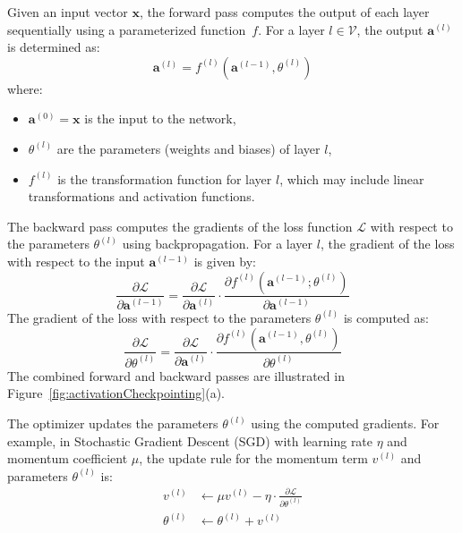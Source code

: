 \documentclass[lettersize,journal]{IEEEtran}
\begin{document}
Given an input vector \(\mathbf{x}\), the forward pass computes the output of each layer sequentially using a parameterized function~\(f\). For a layer \(l \in \mathcal{V}\), the output \(\mathbf{a}^{(l)}\) is determined as:
\begin{equation}\label{eq:forward}
    \mathbf{a}^{(l)} = f^{(l)}(\mathbf{a}^{(l-1)}, \theta^{(l)})
\end{equation}
where:
\begin{itemize}
    \item \(\mathbf{a}^{(0)} = \mathbf{x}\) is the input to the network,
    \item \(\theta^{(l)}\) are the parameters (weights and biases) of layer \(l\),
    \item \(f^{(l)}\) is the transformation function for layer \(l\), which may include linear transformations and activation functions.
\end{itemize}

The backward pass computes the gradients of the loss function \(\mathcal{L}\) with respect to the parameters \(\theta^{(l)}\) using backpropagation. For a layer \(l\), the gradient of the loss with respect to the input \(\mathbf{a}^{(l-1)}\) is given by:
\begin{equation}\label{eq:inputGradient}
    \frac{\partial \mathcal{L}}{\partial \mathbf{a}^{(l-1)}} = \frac{\partial \mathcal{L}}{\partial \mathbf{a}^{(l)}} \cdot \frac{\partial f^{(l)}(\mathbf{a}^{(l-1)}; \theta^{(l)})}{\partial \mathbf{a}^{(l-1)}}
\end{equation}
The gradient of the loss with respect to the parameters \(\theta^{(l)}\) is computed as:
\begin{equation}\label{eq:weightGradient}
    \frac{\partial \mathcal{L}}{\partial \theta^{(l)}} = \frac{\partial \mathcal{L}}{\partial \mathbf{a}^{(l)}} \cdot \frac{\partial f^{(l)}(\mathbf{a}^{(l-1)}, \theta^{(l)})}{\partial \theta^{(l)}}
\end{equation}
The combined forward and backward passes are illustrated in Figure~\ref{fig:activationCheckpointing}(a).

The optimizer updates the parameters \(\theta^{(l)}\) using the computed gradients. For example, in Stochastic Gradient Descent (SGD) with learning rate \(\eta\) and momentum coefficient \(\mu\), the update rule for the momentum term \(v^{(l)}\) and parameters \(\theta^{(l)}\) is:
\begin{align}\label{eq:optimizer}
    v^{(l)} &\leftarrow \mu v^{(l)} - \eta \cdot \frac{\partial \mathcal{L}}{\partial \theta^{(l)}} \\
    \theta^{(l)} &\leftarrow \theta^{(l)} + v^{(l)}
\end{align}
\end{document}
